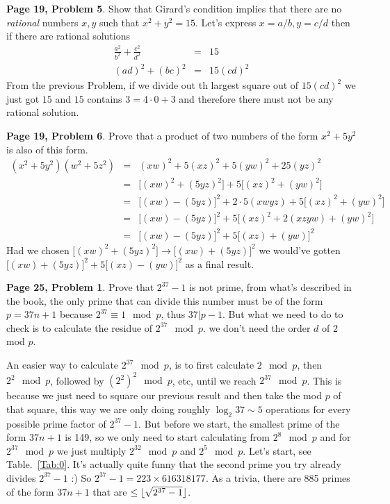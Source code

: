\documentclass[aps,preprint,preprintnumbers,nofootinbib,showpacs,prd]{revtex4-1}
\newcommand{\nbea}{\begin{eqnarray*}}
\newcommand{\neea}{\end{eqnarray*}}
\DeclarePairedDelimiter{\floor}{\lfloor}{\rfloor}
\begin{document}
{\bf Page 19, Problem 5}. Show that Girard's condition implies that there are no {\it rational} numbers $x,y$ such that $x^2 + y^2 = 15$. Let's express $x = a/b, y = c/d$ then if there are rational solutions
%
\nbea
\frac{a^2}{b^2} + \frac{c^2}{d^2} & = & 15 \\
(ad)^2 + (bc)^2 & = & 15 (cd)^2
\neea
%
From the previous Problem, if we divide out th largest square out of $15(cd)^2$ we just got $15$ and $15$ contains $3 = 4\cdot0 + 3$ and therefore there must not be any rational solution.

{\bf Page 19, Problem 6}. Prove that a product of two numbers of the form $x^2 + 5y^2$ is also of this form.
%
\nbea
(x^2 + 5y^2)(w^2 + 5z^2) & = & (xw)^2 + 5(xz)^2 + 5(yw)^2 + 25(yz)^2 \\
& = & \lbrack(xw)^2 + (5yz)^2\rbrack +  5\lbrack (xz)^2 + (yw)^2 \rbrack  \\
& = & \lbrack(xw) - (5yz)\rbrack^2 + 2\cdot5(xwyz) +  5\lbrack (xz)^2 + (yw)^2 \rbrack  \\
& = & \lbrack(xw) - (5yz)\rbrack^2 + 5\lbrack (xz)^2 + 2(xzyw) + (yw)^2 \rbrack  \\
& = & \lbrack(xw) - (5yz)\rbrack^2 + 5\lbrack (xz) + (yw) \rbrack^2
\neea
%
Had we chosen $\lbrack(xw)^2 + (5yz)^2\rbrack \to \lbrack(xw) + (5yz)\rbrack^2$ we would've gotten $\lbrack(xw) + (5yz)\rbrack^2 + 5\lbrack (xz) - (yw) \rbrack^2$ as a final result.

{\bf Page 25, Problem 1}. Prove that $2^{37}-1$ is not prime, from what's described in the book, the only prime that can divide this number must be of the form $p = 37n + 1$ because $2^{37} \equiv 1 \mod{p}$, thus $37|p-1$. But what we need to do to check is to calculate the residue of $2^{37} \mod p$. we don't need the order $d$ of 2 mod $p$.

An easier way to calculate $2^{37} \mod p$, is to first calculate $2 \mod p$, then $2^2 \mod p$, followed by $(2^2)^2 \mod p$, etc, until we reach $2^{37} \mod p$. This is because we just need to square our previous result and then take the mod $p$ of that square, this way we are only doing roughly $\log_2 37 \sim 5$ operations for every possible prime factor of $2^{37}-1$. But before we start, the smallest prime of the form $37n + 1$ is 149, so we only need to start calculating from $2^{8} \mod p$ and for $2^{37} \mod p$ we just multiply $2^{32} \mod p$ and $2^5 \mod p$. Let's start, see Table.~\ref{Tab:0}. It's actually quite funny that the second prime you try already divides $2^{37} - 1$ :) So $2^{37} - 1 = 223 \times 616318177$. As a trivia, there are 885 primes of the form $37n + 1$ that are $\le \floor{\sqrt{2^{37}-1}}$.
\end{document}
